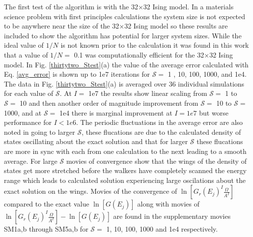 \documentclass[aps,pre,reprint,superscriptaddress,showkeys]{revtex4-2}
\begin{document}
The first test of the algorithm is with the 32$\times$32 Ising model. In a materials science problem with first principles calculations the system size is not expected to be anywhere near the size of the  32$\times$32 Ising model so these results are included to show the algorithm has potential for larger system sizes. While the ideal value of $1/N$ is not known prior to the calculation it was found in this work that a value of $1/N=$ 0.1 was computationally efficient for the 32$\times$32 Ising model. In Fig. \ref{thirtytwo_Stest}(a) the value of the average error calculated with Eq. \ref{avg_error} is shown up to 1e7 iterations for $\mathcal{S}=$ 1 , 10, 100, 1000, and 1e4. The data in Fig. \ref{thirtytwo_Stest}(a) is averaged over 36 individual simulations for each value of $\mathcal{S}$. At $I=$ 1e7 the results show linear scaling from $\mathcal{S}=$ 1 to $\mathcal{S}=$ 10 and then another order of magnitude improvement from $\mathcal{S}=$ 10 to $\mathcal{S}=$ 1000, and at $\mathcal{S}=$ 1e4 there is marginal improvement at $I=1e7$ but worse performance for $I<1e6$.  The periodic fluctuations in the average error are also noted in going to larger $\mathcal{S}$, these flucations are due to the calculated density of states oscillating about the exact solution and that for larger $\mathcal{S}$  these flucations are more in sync with each from one calculation to the next leading to a smooth average. For large $\mathcal{S}$ movies of convergence show that the wings of the density of states get more stretched before the walkers have completely scanned the energy range which leads to calculated solution experiencing large oscilations about the exact solution on the wings. Movies of the convergence of $\ln[G_r(E_j)^I\frac{\Omega}{A^I}]$ compared to the exact value $\ln[G(E_j)]$ along with movies of $\ln[G_r(E_j)^I\frac{\Omega}{A^I}] - \ln[G(E_j)]$ are found in the supplementary movies SM1a,b through SM5a,b for $\mathcal{S}=$ 1, 10, 100, 1000 and 1e4 respectively.  
\end{document}
